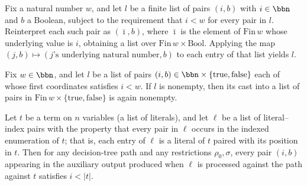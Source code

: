 \begin{lemma}
\label{SwitchingLemma.toFinBlock_map}
\leanok
{}
Fix a natural number $w$, and let $l$ be a finite list of pairs $(i,b)$ with $i \in
\bbn$ and $b$ a Boolean, subject to the requirement that $i < w$ for every pair in $l$.
Reinterpret each such pair as $(\bar\imath, b)$, where $\bar\imath$ is the element of
$\mathrm{Fin}\,w$ whose underlying value is $i$, obtaining a list over $\mathrm{Fin}\,w
\times \mathrm{Bool}$. Applying the map $(j,b) \mapsto (j\text{'s underlying natural
number}, b)$ to each entry of that list yields $l$.
\end{lemma}

\begin{lemma}
\label{SwitchingLemma.toFinBlock_ne_nil}
\leanok
{}
Fix $w \in \bbn$, and let $l$ be a list of pairs $(i, b) \in \bbn \times
\{\mathrm{true}, \mathrm{false}\}$ each of whose first coordinates satisfies $i < w$. If
$l$ is nonempty, then its cast into a list of pairs in $\mathrm{Fin}\,w \times
\{\mathrm{true}, \mathrm{false}\}$ is again nonempty.
\end{lemma}

\begin{lemma}
\label{SwitchingLemma.processClauseLits_aux_idx_lt}
\leanok
{}
Let $t$ be a term on $n$ variables (a list of literals), and let $\ell$ be a list of
literal–index pairs with the property that every pair in $\ell$ occurs in the indexed
enumeration of $t$; that is, each entry of $\ell$ is a literal of $t$ paired with its
position in $t$. Then for any decision-tree path and any restrictions $\rho_0,\sigma$,
every pair $(i,b)$ appearing in the auxiliary output produced when $\ell$ is processed
against the path against $t$ satisfies $i < \lvert t\rvert$.
\end{lemma}

